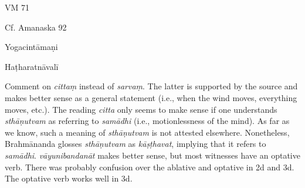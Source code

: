 \begin{ekdosis}
\begin{sources}[hp02_002]
VM 71

\begin{versinnote}
\end{versinnote}
Cf. Amanaska 92

\begin{versinnote}
\end{versinnote}
\end{sources}

\begin{testimonia}[hp02_002]
Yogacintāmaṇi

\begin{versinnote}
\end{versinnote}
Haṭharatnāvalī

\begin{versinnote}
\end{versinnote}

\end{testimonia}

\begin{philcomm}[hp02_002]
Comment on \emph{cittaṃ} instead of \emph{sarvaṃ}. The latter is supported by the source and makes better sense as a general statement (i.e., when the wind moves, everything moves, etc.). The reading \emph{citta} only seems to make sense if one understands \emph{sthāṇutvam} as referring to \emph{samādhi} (i.e., motionlessness of the mind). As far as we know, such a meaning of \emph{sthāṇutvam} is not attested elsewhere. Nonetheless, Brahmānanda glosses \emph{sthāṇutvam} as \emph{kāṣṭhavat}, implying that it refers to \emph{samādhi}.
\emph{vāyunibandanāt} makes better sense, but most witnesses have an optative verb. There was probably confusion over the ablative and optative in 2d and 3d. The optative verb works well in 3d.
\end{philcomm}


\end{ekdosis}
